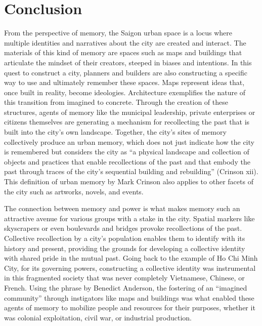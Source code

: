 \chapter{Conclusion}\label{conclusion}
\vi
From the perspective of memory, the Saigon urban space is a locus where multiple identities and narratives about the city are created and interact. The materials of this kind of memory are spaces such as maps and buildings that articulate the mindset of their creators, steeped in biases and intentions. In this quest to construct a city, planners and builders are also constructing a specific way to use and ultimately remember these spaces. Maps represent ideas that, once built in reality, become ideologies. Architecture exemplifies the nature of this transition from imagined to concrete. Through the creation of these structures, agents of memory like the municipal leadership, private enterprises or citizens themselves are generating a mechanism for recollecting the past that is built into the city’s own landscape. Together, the city’s sites of memory collectively produce an urban memory, which does not just indicate how the city is remembered but considers the city as “a physical landscape and collection of objects and practices that enable recollections of the past and that embody the past through traces of the city’s sequential building and rebuilding” (Crinson xii). This definition of urban memory by Mark Crinson also applies to other facets of the city such as artworks, novels, and events.

The connection between memory and power is what makes memory such an attractive avenue for various groups with a stake in the city. Spatial markers like skyscrapers or even boulevards and bridges provoke recollections of the past. Collective recollection by a city’s population enables them to identify with its history and present, providing the grounds for developing a collective identity with shared pride in the mutual past. Going back to the example of Ho Chi Minh City, for its governing powers, constructing a collective identity was instrumental in this fragmented society that was never completely Vietnamese, Chinese, or French. Using the phrase by Benedict Anderson, the fostering of an “imagined community” through instigators like maps and buildings was what enabled these agents of memory to mobilize people and resources for their purposes, whether it was colonial exploitation, civil war, or industrial production. 

